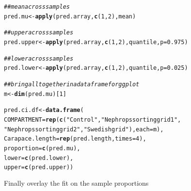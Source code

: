 \documentclass[12pt]{article}\usepackage[]{graphicx}\usepackage[]{color}
\makeatletter
\newcommand{\hlnum}[1]{\textcolor[rgb]{0.686,0.059,0.569}{#1}}%
\newcommand{\hlstr}[1]{\textcolor[rgb]{0.192,0.494,0.8}{#1}}%
\newcommand{\hlcom}[1]{\textcolor[rgb]{0.678,0.584,0.686}{\textit{#1}}}%
\newcommand{\hlstd}[1]{\textcolor[rgb]{0.345,0.345,0.345}{#1}}%
\newcommand{\hlkwb}[1]{\textcolor[rgb]{0.69,0.353,0.396}{#1}}%
\newcommand{\hlkwc}[1]{\textcolor[rgb]{0.333,0.667,0.333}{#1}}%
\newcommand{\hlkwd}[1]{\textcolor[rgb]{0.737,0.353,0.396}{\textbf{#1}}}%
\newenvironment{kframe}{%
 \def\at@end@of@kframe{}%
 \ifinner\ifhmode%
  \def\at@end@of@kframe{\end{minipage}}%
  \begin{minipage}{\columnwidth}%
 \fi\fi%
 \def\FrameCommand##1{\hskip\@totalleftmargin \hskip-\fboxsep
 \colorbox{shadecolor}{##1}\hskip-\fboxsep
     \hskip-\linewidth \hskip-\@totalleftmargin \hskip\columnwidth}%
 \MakeFramed {\advance\hsize-\width
   \@totalleftmargin\z@ \linewidth\hsize
   \@setminipage}}%
 {\par\unskip\endMakeFramed%
 \at@end@of@kframe}
\newenvironment{knitrout}{}{} %
\makeatother
\begin{document}
\begin{knitrout}
\begin{kframe}
\begin{alltt}
\hlcom{## mean across samples}
\hlstd{pred.mu} \hlkwb{<-} \hlkwd{apply}\hlstd{(pred.array,} \hlkwd{c}\hlstd{(}\hlnum{1}\hlstd{,} \hlnum{2}\hlstd{), mean)}

\hlcom{## upper across samples}
\hlstd{pred.upper} \hlkwb{<-} \hlkwd{apply}\hlstd{(pred.array,} \hlkwd{c}\hlstd{(}\hlnum{1}\hlstd{,} \hlnum{2}\hlstd{), quantile,} \hlkwc{p} \hlstd{=} \hlnum{0.975}\hlstd{)}

\hlcom{## lower across samples}
\hlstd{pred.lower} \hlkwb{<-} \hlkwd{apply}\hlstd{(pred.array,} \hlkwd{c}\hlstd{(}\hlnum{1}\hlstd{,} \hlnum{2}\hlstd{), quantile,} \hlkwc{p} \hlstd{=} \hlnum{0.025}\hlstd{)}

\hlcom{## bring all together in a data frame for ggplot}
\hlstd{m} \hlkwb{<-} \hlkwd{dim}\hlstd{(pred.mu)[}\hlnum{1}\hlstd{]}

\hlstd{pred.ci.df} \hlkwb{<-} \hlkwd{data.frame}\hlstd{(}
                \hlkwc{COMPARTMENT} \hlstd{=} \hlkwd{rep}\hlstd{(}\hlkwd{c}\hlstd{(}\hlstr{"Control"}\hlstd{,} \hlstr{"Nephrops sorting grid 1"}\hlstd{,}
                  \hlstr{"Nephrops sorting grid 2"}\hlstd{,} \hlstr{"Swedish grid"}\hlstd{),} \hlkwc{each} \hlstd{= m),}
                \hlkwc{Carapace.length} \hlstd{=} \hlkwd{rep}\hlstd{(pred.length,} \hlkwc{times} \hlstd{=} \hlnum{4}\hlstd{),}
                \hlkwc{proportion} \hlstd{=} \hlkwd{c}\hlstd{(pred.mu),}
                \hlkwc{lower} \hlstd{=} \hlkwd{c}\hlstd{(pred.lower),}
                \hlkwc{upper} \hlstd{=} \hlkwd{c}\hlstd{(pred.upper))}
\end{alltt}
\end{kframe}
\end{knitrout}

Finally overlay the fit on the sample proportions
\end{document}
